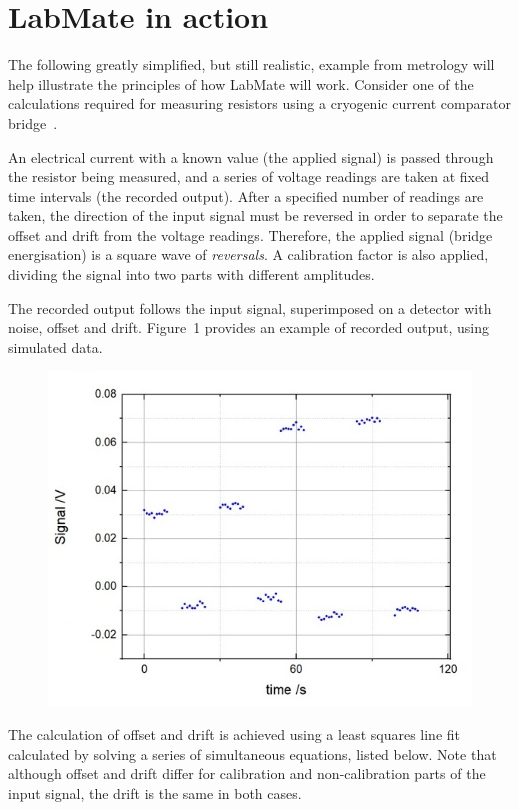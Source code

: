 \documentclass{IMEKO2024}
\begin{document}
\section{LabMate in action}
\label{sec:example}


The following greatly simplified, but still realistic, example from metrology  will help illustrate the principles of how LabMate will work. Consider one of the calculations required for measuring resistors using a cryogenic current comparator bridge~\cite{Williams_2010}.

An electrical current with a known value (the applied signal) is passed through the resistor being measured, and a series of voltage readings are taken at fixed time intervals (the recorded output). After a specified number of readings are taken, the direction of the input signal must be reversed in order to separate the offset and drift from the voltage readings. Therefore, the applied signal (bridge energisation) is a square wave of {\em reversals}. A calibration factor is also applied, dividing the signal into two parts with different amplitudes.

The recorded output follows the input signal, superimposed on a detector with noise, offset and drift. Figure~1%
provides an example of recorded output, using simulated data.
\begin{figure}[H]
  \begin{center}
    \includegraphics[width=0.6\linewidth]{example_output.jpg}
    \label{fig:rec_out}
  \end{center}
\end{figure}

The calculation of offset and drift is achieved using a least squares line fit calculated by solving a series of simultaneous equations, listed below. Note that although offset and drift differ for calibration and non-calibration parts of the input signal, the drift is the same in both cases.
\end{document}
